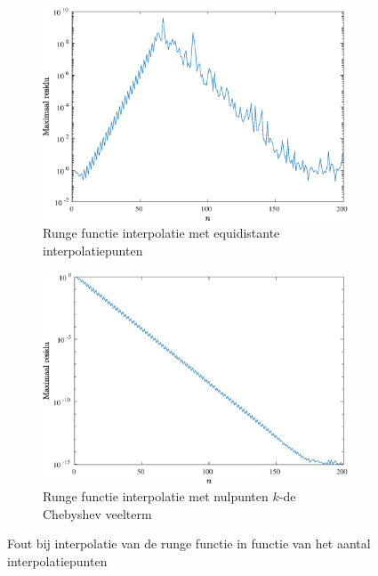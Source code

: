 \documentclass[a4paper, 12pt, titlepage, fleqn]{article}
\begin{document}
\begin{figure}
\begin{subfigure}[b]{0.45\textwidth}
\includegraphics[width=\linewidth]{../Afbeeldingen/runge_equi_fout.eps}
\caption{Runge functie interpolatie met equidistante interpolatiepunten}
\end{subfigure}
\hfill
\begin{subfigure}[b]{0.45\textwidth}
\includegraphics[width=\linewidth]{../Afbeeldingen/runge_nul_fout.eps}
\caption{Runge functie interpolatie met nulpunten $k$-de Chebyshev veelterm}
\end{subfigure}
\caption{Fout bij interpolatie van de runge functie in functie van het aantal interpolatiepunten}
\label{fig:rungeFout}
\end{figure}
\end{document}
